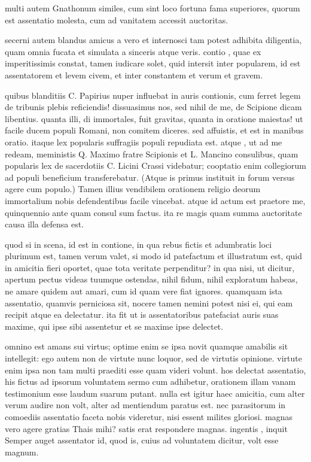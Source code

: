  multi autem Gnathonum similes, cum sint loco fortuna fama superiores, quorum est assentatio molesta, cum ad vanitatem accessit auctoritas.

 secerni autem blandus amicus a vero et internosci tam potest adhibita diligentia, quam omnia fucata et simulata a sinceris atque veris. contio , quae ex imperitissimis constat, tamen iudicare solet, quid intersit inter popularem, id est assentatorem et levem civem, et inter constantem et verum et gravem.

 quibus blanditiis C. Papirius nuper influebat in auris contionis, cum ferret legem de tribunis plebis reficiendis! dissuasimus nos, sed nihil de me, de Scipione dicam libentius. quanta illi, di immortales, fuit gravitas, quanta in oratione maiestas! ut facile ducem populi Romani, non comitem diceres. sed affuistis, et est in manibus oratio. itaque lex popularis suffragiis populi repudiata est. atque , ut ad me redeam, meministis Q. Maximo fratre Scipionis et L. Mancino consulibus, quam popularis lex de sacerdotiis C. Licini Crassi videbatur; cooptatio enim collegiorum ad populi beneficium transferebatur. (Atque is primus instituit in forum versus agere cum populo.) Tamen illius vendibilem orationem religio deorum immortalium nobis defendentibus facile vincebat. atque id actum est praetore me, quinquennio ante quam consul sum factus. ita re magis quam summa auctoritate causa illa defensa est.

 quod si in scena, id est in contione, in qua rebus fictis et adumbratis loci plurimum est, tamen verum valet, si modo id patefactum et illustratum est, quid in amicitia fieri oportet, quae tota veritate perpenditur? in qua nisi, ut dicitur, apertum pectus videas tuumque ostendas, nihil fidum, nihil exploratum habeas, ne amare quidem aut amari, cum id quam vere fiat ignores. quamquam ista assentatio, quamvis perniciosa sit, nocere tamen nemini potest nisi ei, qui eam recipit atque ea delectatur. ita fit ut is assentatoribus patefaciat auris suas maxime, qui ipse sibi assentetur et se maxime ipse delectet.

 omnino est amans sui virtus; optime enim se ipsa novit quamque amabilis sit intellegit: ego autem non de virtute nunc loquor, sed de virtutis opinione. virtute enim ipsa non tam multi praediti esse quam videri volunt. hos delectat assentatio, his fictus ad ipsorum voluntatem sermo cum adhibetur, orationem illam vanam testimonium esse laudum suarum putant. nulla est igitur haec amicitia, cum alter verum audire non volt, alter ad mentiendum paratus est. nec parasitorum in comoediis assentatio faceta nobis videretur, nisi essent milites gloriosi. magnas vero agere gratias Thais mihi? satis erat respondere magnas. ingentis , inquit Semper auget assentator id, quod is, cuius ad voluntatem dicitur, volt esse magnum.

